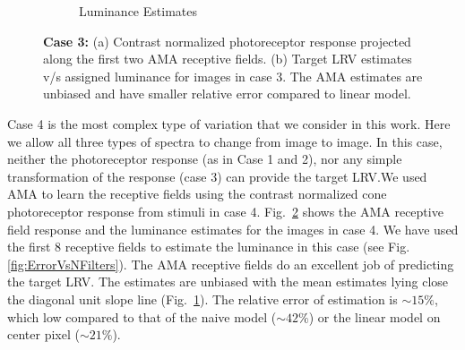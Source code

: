 \documentclass{jov}
\begin{document}
\begin{figure}
\begin{subfigure}[b]{0.3 \textwidth}
        \caption{Luminance Estimates}
        \label{fig:case12Results}
    \end{subfigure}
    \caption{{\bf Case 3:} (a) Contrast normalized photoreceptor response projected along the first two AMA receptive fields. (b) Target LRV estimates v/s assigned luminance for images in case 3. The AMA estimates are unbiased and have smaller relative error compared to linear model.}
    \label{fig:case12AllResults}
\end{figure}

Case 4 is the most complex type of variation that we consider in this work. Here we allow all three types of spectra to change from image to image. In this case, neither the photoreceptor response (as in Case 1 and 2), nor any simple transformation of the response (case 3) can provide the target LRV.We used AMA to learn the receptive fields using the contrast normalized cone photoreceptor response from stimuli in case 4. Fig.~\ref{fig:case12AllResults} shows the AMA receptive field response and the luminance estimates for the images in case 4. 
We have used the first 8 receptive fields to estimate the luminance in this case (see Fig.\ref{fig:ErrorVsNFilters}). 
The AMA receptive fields do an excellent job of predicting the target LRV. 
The estimates are unbiased with the mean estimates lying close the diagonal unit slope line (Fig.~\ref{fig:case12Results}). 
The relative error of estimation is $\sim15\%$, which low compared to that of the naive model ($\sim42\%$) or the linear model on center pixel ($\sim21\%$).
\end{document}
